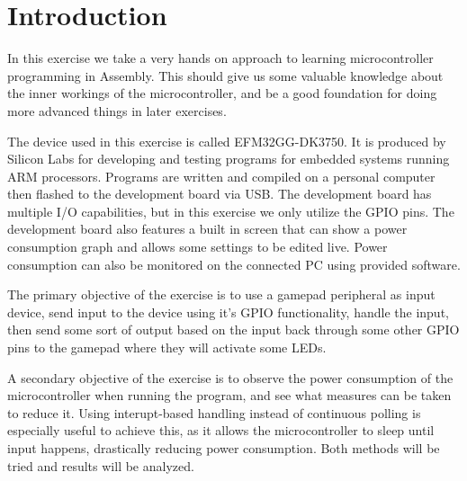\chapter{Introduction}
In this exercise we take a very hands on approach to learning microcontroller programming in Assembly. This should give us some valuable knowledge about the inner workings of the microcontroller, and be a good foundation for doing more advanced things in later exercises.

The device used in this exercise is called EFM32GG-DK3750. It is produced by Silicon Labs for developing and testing programs for embedded systems running ARM processors. Programs are written and compiled on a personal computer then flashed to the development board via USB. The development board has multiple I/O capabilities, but in this exercise we only utilize the GPIO pins. The development board also features a built in screen that can show a power consumption graph and allows some settings to be edited live. Power consumption can also be monitored on the connected PC using provided software.

The primary objective of the exercise is to use a gamepad peripheral as input device, send input to the device using it's GPIO functionality, handle the input, then send some sort of output based on the input back through some other GPIO pins to the gamepad where they will activate some LEDs.

A secondary objective of the exercise is to observe the power consumption of the microcontroller when running the program, and see what measures can be taken to reduce it. Using interupt-based handling instead of continuous polling is especially useful to achieve this, as it allows the microcontroller to sleep until input happens, drastically reducing power consumption. Both methods will be tried and results will be analyzed.
